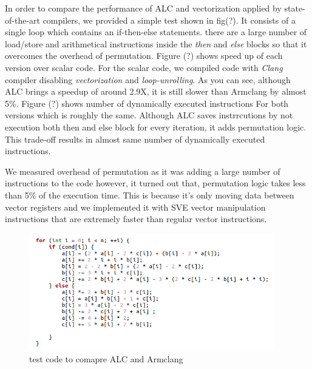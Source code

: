 \documentclass[\main/thesis.tex]{subfiles}
\begin{document}
In order to compare the performance of ALC and vectorization applied by state-of-the-art compilers, we provided a simple test shown in fig(?). It consists of a single loop which contains an if-then-else statements. there are a large number of load/store and arithmetical instructions inside the \emph{then} and \emph{else} blocks so that it overcomes the overhead of permutation. Figure (?) shows speed up of each version over scalar code.
For the scalar code, we compiled code with \emph{Clang} compiler disabling \emph{vectorization} and \emph{loop-unrolling}. As you can see, although ALC brings a speedup of around 2.9X, it is still slower than Armclang by almost 5\%.
Figure (?) shows number of dynamically executed instructions For both versions which is roughly the same. Although ALC saves instrrcutions by not execution both then and else block for every iteration, it adds permutation logic. This trade-off results in almost same number of dynamically executed instructions.  

We measured overhead of permutation as it was adding a large number of instructions to the code however, it turned out that, permutation logic takes less than 5\% of the execution time. This is because it's only moving data between vector registers and we implemented it with SVE vector manipulation instructions that are extremely faster than regular vector instructions.


\begin{figure}[t!]
    \centering
    \includegraphics[width=0.95\textwidth]{img/test.png}
    \caption{test code to comapre ALC and Armclang}
    \label{fig:iterative_alc}
\end{figure}
\end{document}
